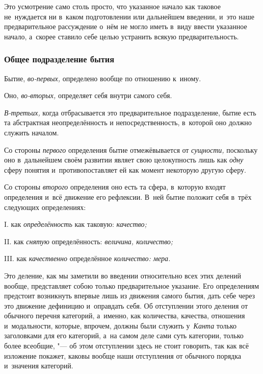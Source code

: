 Это усмотрение само столь просто, что указанное начало как таковое
не~нуждается ни в~каком подготовлении или дальнейшем введении, и~это наше
предварительное рассуждение о~нём не могло иметь в~виду ввести указанное
начало, а~скорее ставило себе целью устранить всякую предварительность.

\subsubsection{Общее подразделение бытия}

Бытие, {\em во-первых,} определено вообще по отношению к~иному.

Оно, {\em во-вторых,} определяет себя внутри самого себя.

{\em В-третьих,} когда отбрасывается это предварительное
подразделение, бытие есть та абстрактная неопределённость и
непосредственность, в~которой оно должно служить началом.

Со стороны {\em первого} определения бытие отмежёвывается от {\em сущности,}
поскольку оно в~дальнейшем своём развитии являет свою целокупность лишь как
{\em одну} сферу понятия и~противопоставляет ей как момент
некоторую другую сферу.

Со стороны {\em второго} определения оно есть та сфера, в~которую входят
определения и~всё движение его рефлексии. В~ней бытие положит себя в~трёх
следующих определениях:

I. как {\em определённость} как таковую: {\em качество;}

II. как {\em снятую} определённость: {\em величина, количество;}

III. как {\em качественно} определённое {\em количество: мера.}

Это деление, как мы заметили во введении относительно всех этих делений вообще,
представляет собою только предварительное указание. Его определениям предстоит
возникнуть впервые лишь из движения самого бытия, дать себе через это движение
дефиницию и~оправдать себя. Об отступлении этого деления от обычного перечня
категорий, а~именно, как количества, качества, отношения и~модальности,
которые, впрочем, должны были служить у~{\em Канта} только заголовками для его
категорий, а~на самом деле сами суть категории, только более всеобщие, "--- об
этом отступлении здесь не стоит говорить, так как всё изложение покажет, каковы
вообще наши отступления от обычного порядка и~значения категорий.

